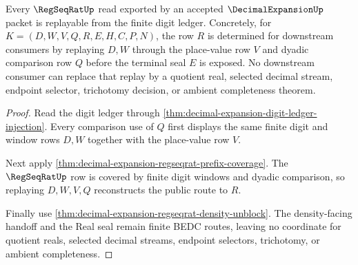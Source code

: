 \begin{theorem}
\label{thm:decimal-expansion-regseqrat-digit-replay}
Every $\RegSeqRatUp$ read exported by an accepted $\DecimalExpansionUp$ packet is replayable from the finite digit ledger. Concretely, for $K=(D,W,V,Q,R,E,H,C,P,N)$, the row $R$ is determined for downstream consumers by replaying $D,W$ through the place-value row $V$ and dyadic comparison row $Q$ before the terminal seal $E$ is exposed. No downstream consumer can replace that replay by a quotient real, selected decimal stream, endpoint selector, trichotomy decision, or ambient completeness theorem.
\end{theorem}
\begin{proof}
Read the digit ledger through \autoref{thm:decimal-expansion-digit-ledger-injection}. Every comparison use of $Q$ first displays the same finite digit and window rows $D,W$ together with the place-value row $V$.

Next apply \autoref{thm:decimal-expansion-regseqrat-prefix-coverage}. The $\RegSeqRatUp$ row is covered by finite digit windows and dyadic comparison, so replaying $D,W,V,Q$ reconstructs the public route to $R$.

Finally use \autoref{thm:decimal-expansion-regseqrat-density-unblock}. The density-facing handoff and the Real seal remain finite BEDC routes, leaving no coordinate for quotient reals, selected decimal streams, endpoint selectors, trichotomy, or ambient completeness.
\end{proof}

